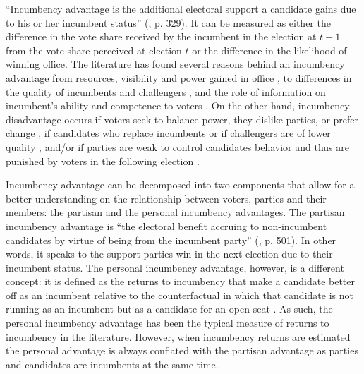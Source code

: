 \documentclass[12pt]{amsart}
\numberwithin{equation}{section}
\theoremstyle{definition}
\theoremstyle{definition}
\theoremstyle{definition}
\begin{document}
``Incumbency advantage is the additional electoral support a candidate gains due to his or her incumbent status'' (\citet{cox_morgensten_1993}, p. 329). It can be measured as either the difference in the vote share received by the incumbent in the election at $t+1$ from the vote share perceived at election $t$ or the difference in the likelihood of winning office. The literature has found several reasons behind an incumbency advantage from resources, visibility and power gained in office \citep{mayhew_1974, fiorina_1989, king_1991, cox_morgensten_1993}, to differences in the quality of incumbents and challengers \citep{cox_katz_1996, levitt_wolfram_1997, ansolabehere_snyder_2000, eggers_2017}, and the role of information on incumbent's ability and competence to voters \citep{ashworth_bdm_2008, ashworth_etal_2019}. On the other hand, incumbency disadvantage occurs if voters seek to balance power, they dislike parties, or prefer change  \citep{fowler_hall_2014, eggers_2017}, if candidates who replace incumbents or if challengers are of lower quality \citep{eggers_2017}, and/or if parties are weak to control candidates behavior and thus are punished by voters in the following election \citep{klasnja_titiunik_2017}.


Incumbency advantage can be decomposed into two components that allow for a better understanding on the relationship between voters, parties and their members: the partisan and the personal incumbency advantages. The partisan incumbency advantage is “the electoral benefit accruing to non-incumbent candidates by virtue of being from the incumbent party” (\citet{fowler_hall_2014}, p. 501). In other words, it speaks to the support parties win in the next election due to their incumbent status. The personal incumbency advantage, however, is a different concept: it is defined as the returns to incumbency that make a candidate better off as an incumbent relative to the counterfactual in which that candidate is not running as an incumbent but as a candidate for an open seat \citep{fowler_hall_2014}. As such, the personal incumbency advantage has been the typical measure of returns to incumbency in the literature. However, when incumbency returns are estimated the personal advantage is always conflated with the partisan advantage as parties and candidates are incumbents at the same time. 
\end{document}
